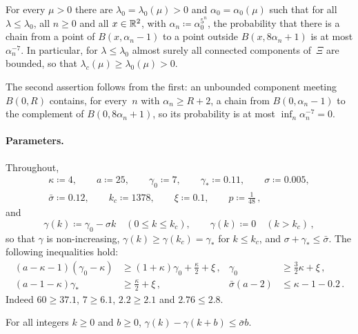 \documentclass[11pt,letterpaper]{article}
\begin{document}
\begin{theorem}
\label{thm:main}
For every $\mu>0$ there are $\lambda_0=\lambda_0(\mu)>0$ and $\alpha_0=\alpha_0(\mu)$ such that for all $\lambda\le\lambda_0$, all $n\ge0$ and all $x\in\mathbb R^2$, with $\alpha_n\coloneqq\alpha_0^{5^n}$, the probability that there is a chain from a point of $B(x,\alpha_n-1)$ to a point outside $B(x,8\alpha_n+1)$ is at most $\alpha_n^{-7}$. In particular, for $\lambda\le\lambda_0$ almost surely all connected components of~$\Xi$ are bounded, so that $\lambda_c(\mu)\ge\lambda_0(\mu)>0$.
\end{theorem}

The second assertion follows from the first: an unbounded component meeting $B(0,R)$ contains, for every~$n$ with $\alpha_n\ge R+2$, a chain from $B(0,\alpha_n-1)$ to the complement of $B(0,8\alpha_n+1)$, so its probability is at most $\inf_n\alpha_n^{-7}=0$.

\paragraph{Parameters.} Throughout,
\begin{equation}
\label{eq:param}
\begin{gathered}
  \kappa\coloneqq4,\qquad a\coloneqq25,\qquad\gamma_0\coloneqq7,\qquad\gamma_*\coloneqq0.11,\qquad\sigma\coloneqq0.005,\\
  \bar\sigma\coloneqq0.12,\qquad k_c\coloneqq1378,\qquad\xi\coloneqq0.1,\qquad p\coloneqq\tfrac1{48}\,,
\end{gathered}
\end{equation}
and
\begin{equation}
\label{eq:gamma}
  \gamma(k)\coloneqq\gamma_0-\sigma k\quad(0\le k\le k_c),\qquad\gamma(k)\coloneqq0\quad(k>k_c)\,,
\end{equation}
so that $\gamma$ is non-increasing, $\gamma(k)\ge\gamma(k_c)=\gamma_*$ for $k\le k_c$, and $\sigma+\gamma_*\le\bar\sigma$. The following inequalities hold:
\begin{align}
\label{eq:P1}
  (a-\kappa-1)(\gamma_0-\kappa)&\ge(1+\kappa)\gamma_0+\tfrac\kappa2+\xi\,,&\gamma_0&\ge\tfrac32\kappa+\xi\,,\\
\label{eq:P3}
  (a-1-\kappa)\gamma_*&\ge\tfrac\kappa2+\xi\,,&\bar\sigma(a-2)&\le\kappa-1-0.2\,.
\end{align}
Indeed $60\ge37.1$, $7\ge6.1$, $2.2\ge2.1$ and $2.76\le2.8$.

\begin{lemma}[Profile]
\label{lem:profile}
For all integers $k\ge0$ and $b\ge0$, $\gamma(k)-\gamma(k+b)\le\bar\sigma b$.
\end{lemma}
\end{document}
